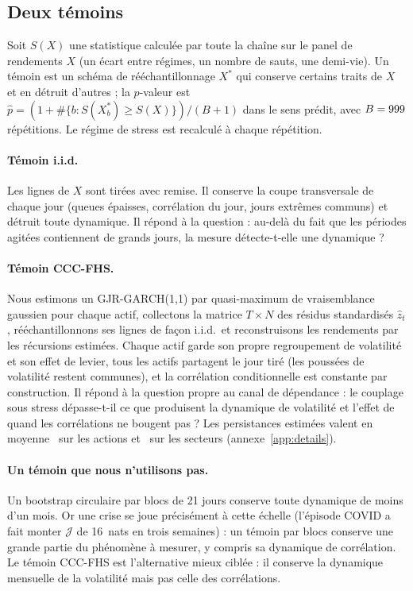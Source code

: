 \documentclass[12pt]{article}
\theoremstyle{definition}
\newcommand{\JJ}{\mathcal{J}}
\begin{document}
\begin{doublespace}
\subsection{Deux témoins}

Soit $S(X)$ une statistique calculée par toute la chaîne sur le panel de
rendements $X$ (un écart entre régimes, un nombre de sauts, une demi-vie). Un
témoin est un schéma de rééchantillonnage $X^*$ qui conserve certains traits
de $X$ et en détruit d'autres ; la $p$-valeur est
$\hat p=(1+\#\{b:S(X^*_b)\ge S(X)\})/(B+1)$ dans le sens prédit, avec
$B=999$ répétitions. Le régime de stress est recalculé à chaque répétition.

\paragraph{Témoin i.i.d.} Les lignes de $X$ sont tirées avec remise. Il
conserve la coupe transversale de chaque jour (queues épaisses, corrélation du
jour, jours extrêmes communs) et détruit toute dynamique. Il répond à la
question : au-delà du fait que les périodes agitées contiennent de grands
jours, la mesure détecte-t-elle une dynamique ?

\paragraph{Témoin CCC-FHS.} Nous estimons un GJR-GARCH(1,1) par
quasi-maximum de vraisemblance gaussien pour chaque actif, collectons la
matrice $T\times N$ des résidus standardisés $\hat z_t$, rééchantillonnons ses
lignes de façon i.i.d.\ et reconstruisons les rendements par les récursions
estimées. Chaque actif garde son propre regroupement de volatilité et son
effet de levier, tous les actifs partagent le jour tiré (les poussées de
volatilité restent communes), et la corrélation conditionnelle est constante
par construction. Il répond à la question propre au canal de dépendance : le
couplage sous stress dépasse-t-il ce que produisent la dynamique de
volatilité et l'effet de \citet{forbes2002} quand les corrélations ne bougent
pas ? Les persistances estimées valent en moyenne \gjrSpPers\ sur les actions
et \gjrFfPers\ sur les secteurs (annexe~\ref{app:details}).

\paragraph{Un témoin que nous n'utilisons pas.} Un bootstrap circulaire par
blocs de 21 jours conserve toute dynamique de moins d'un mois. Or une crise se
joue précisément à cette échelle (l'épisode COVID a fait monter $\JJ$ de
16~nats en trois semaines) : un témoin par blocs conserve une grande partie du
phénomène à mesurer, y compris sa dynamique de corrélation. Le témoin CCC-FHS
est l'alternative mieux ciblée : il conserve la dynamique mensuelle de la
volatilité mais pas celle des corrélations.


\end{doublespace}
\end{document}
